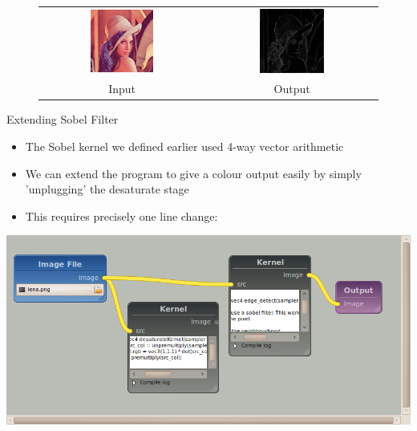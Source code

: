 \documentclass{beamer}
\newcommand{\bi}{\begin{itemize}}
\newcommand{\ei}{\end{itemize}}
\begin{document}
\begin{frame}

\end{frame}

\begin{frame}
\begin{figure}\centering
\begin{tabular}{cc}
\includegraphics[width=0.4\textwidth]{examples/reduce/lena} &
\includegraphics[width=0.4\textwidth]{examples/reduce/output_example3} \\
Input & Output
\end{tabular}
\end{figure}
\end{frame}

\begin{frame}{Extending Sobel Filter}
  \bi
    \item The Sobel kernel we defined earlier used 4-way vector arithmetic
    \item We can extend the program to give a colour output easily by simply
    'unplugging' the desaturate stage
    \item This requires precisely one line change:
    
  \ei
\end{frame}

\begin{frame}
\includegraphics[width=\textwidth]{sobel-2-pipeline}
\end{frame}
\end{document}
